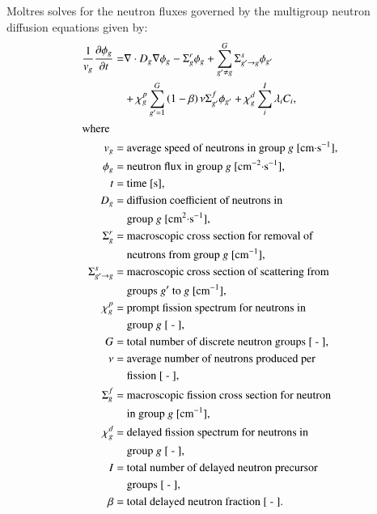 Moltres solves for the neutron fluxes governed by
the multigroup neutron diffusion equations given by:
%
\begin{align}
    \frac{1}{v_g} \frac{\partial \phi_g}{\partial t} =& \nabla \cdot D_g
    \nabla \phi_g - \Sigma^r_g \phi_g +
    \sum^G_{g' \neq g} \Sigma^s_{g' \rightarrow g} \phi_{g'} \nonumber \\
    &+ \chi^p_g \sum^G_{g'=1} \left( 1-\beta \right) \nu \Sigma^f_{g'}
    \phi_{g'} + \chi^d_g \sum^I_i \lambda_i C_i, \label{eq:neut} \\
    \intertext{where}
    v_g =& \text{ average speed of neutrons in group $g$ [cm$\cdot$s$^{-1}$],} 
    \nonumber \\
    \phi_g =& \text{ neutron flux in group $g$ [cm$^{-2}\cdot$s$^{-1}$],}
    \nonumber \\
    t =& \text{ time [s],} \nonumber \\
    D_g =& \text{ diffusion coefficient of neutrons in} \nonumber \\
    &\text{ group $g$ [cm$^2\cdot$s$^{-1}$],} \nonumber \\
    \Sigma^r_g =& \text{ macroscopic cross section for removal of} \nonumber \\
    &\text{ neutrons from group $g$ [cm$^{-1}$],} \nonumber \\
    \Sigma^s_{g' \rightarrow g} =& \text{ macroscopic cross section of
    scattering from} \nonumber \\
    &\text{ groups $g'$ to $g$ [cm$^{-1}$],} \nonumber \\
    \chi^p_g =& \text{ prompt fission spectrum for neutrons in} \nonumber \\
    &\text{ group $g$ [ - ],} \nonumber \\
    G =& \text{ total number of discrete neutron groups [ - ],} \nonumber \\
    \nu =& \text{ average number of neutrons produced per} \nonumber \\
    &\text{ fission [ - ],} \nonumber \\
    \Sigma^f_{g} =& \text{ macroscopic fission cross section for neutron}
    \nonumber \\
    &\text{ in group $g$ [cm$^{-1}$],} \nonumber \\
    \chi^d_g =& \text{ delayed fission spectrum for neutrons in} \nonumber \\
    &\text{ group $g$ [ - ],} \nonumber \\
    I =& \text{ total number of delayed neutron precursor} \nonumber \\
    &\text{ groups [ - ],} \nonumber \\
    \beta =& \text{ total delayed neutron fraction [ - ].} \nonumber
\end{align}

